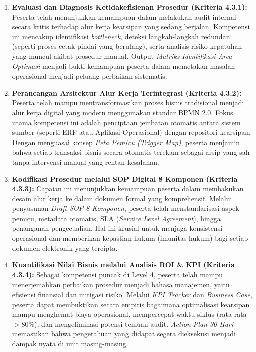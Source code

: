 \documentclass[12pt,a4paper]{report}
\begin{document}
\begin{enumerate}[leftmargin=*]
    \item \textbf{Evaluasi dan Diagnosis Ketidakefisienan Prosedur (Kriteria 4.3.1):}
    Peserta telah menunjukkan kemampuan dalam melakukan audit internal secara kritis terhadap alur kerja kearsipan yang sedang berjalan. Kompetensi ini mencakup identifikasi \textit{bottleneck}, deteksi langkah-langkah redundan (seperti proses cetak-pindai yang berulang), serta analisis risiko kepatuhan yang muncul akibat prosedur manual. Output \textit{Matriks Identifikasi Area Optimasi} menjadi bukti kemampuan peserta dalam memetakan masalah operasional menjadi peluang perbaikan sistematis.

    \item \textbf{Perancangan Arsitektur Alur Kerja Terintegrasi (Kriteria 4.3.2):}
    Peserta telah mampu mentransformasikan proses bisnis tradisional menjadi alur kerja digital yang modern menggunakan standar BPMN 2.0. Fokus utama kompetensi ini adalah penciptaan jembatan otomatis antara sistem sumber (seperti ERP atau Aplikasi Operasional) dengan repositori kearsipan. Dengan menguasai konsep \textit{Peta Pemicu (Trigger Map)}, peserta menjamin bahwa setiap transaksi bisnis secara otomatis terekam sebagai arsip yang sah tanpa intervensi manual yang rentan kesalahan.

    \item \textbf{Kodifikasi Prosedur melalui SOP Digital 8 Komponen (Kriteria 4.3.3):}
    Capaian ini menunjukkan kemampuan peserta dalam membakukan desain alur kerja ke dalam dokumen formal yang komprehensif. Melalui penyusunan \textit{Draft SOP 8 Komponen}, peserta telah menstandarisasi aspek pemicu, metadata otomatis, SLA (\textit{Service Level Agreement}), hingga penanganan pengecualian. Hal ini krusial untuk menjaga konsistensi operasional dan memberikan kepastian hukum (imunitas hukum) bagi setiap dokumen elektronik yang tercipta.

    \item \textbf{Kuantifikasi Nilai Bisnis melalui Analisis ROI \& KPI (Kriteria 4.3.4):}
    Sebagai kompetensi puncak di Level 4, peserta telah mampu menerjemahkan perbaikan prosedur menjadi bahasa manajemen, yaitu efisiensi finansial dan mitigasi risiko. Melalui \textit{KPI Tracker} dan \textit{Business Case}, peserta dapat membuktikan secara empiris bagaimana optimalisasi kearsipan mampu menghemat biaya operasional, mempercepat waktu siklus (rata-rata $>$80\%), dan mengeliminasi potensi temuan audit. \textit{Action Plan 30 Hari} memastikan bahwa pengetahuan yang didapat segera dieksekusi menjadi dampak nyata di unit masing-masing.
\end{enumerate}
\end{document}
